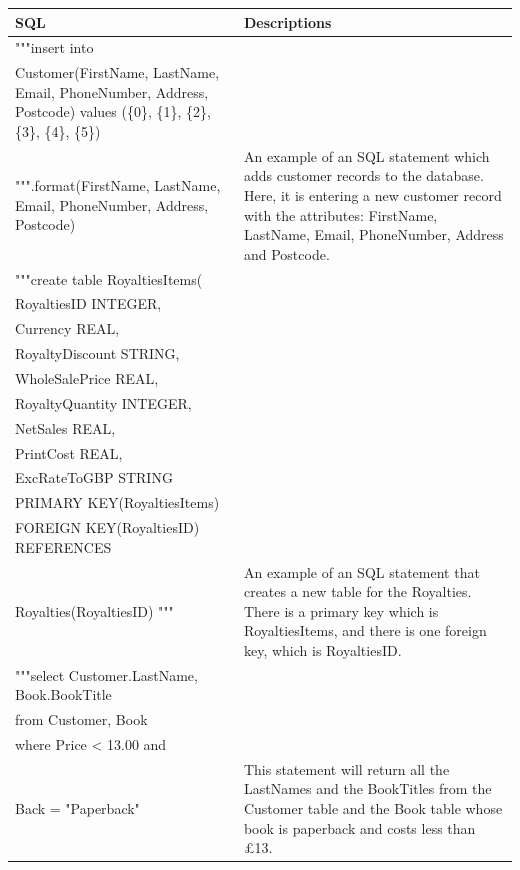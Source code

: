 \begin{tabular}{|p{10cm}|p{5cm}|}
    \hline
    \textbf{SQL} & \textbf{Descriptions} \\ \hline 
     """insert into \\ Customer(FirstName, LastName, Email, PhoneNumber, Address, Postcode) values (\{0\}, \{1\}, \{2\}, \{3\}, \{4\}, \{5\}) \\ """.format(FirstName, LastName, Email, PhoneNumber, Address, Postcode) & An example of an SQL statement which adds customer records to the database. Here, it is entering a new customer record with the attributes: FirstName, LastName, Email, PhoneNumber, Address and Postcode. \\ \hline
    """create table RoyaltiesItems(\\ RoyaltiesID INTEGER, \\ Currency REAL, \\ RoyaltyDiscount STRING,\\  WholeSalePrice REAL,\\ RoyaltyQuantity INTEGER,\\ NetSales REAL,\\ PrintCost REAL, \\ ExcRateToGBP STRING \\ PRIMARY KEY(RoyaltiesItems) \\ FOREIGN KEY(RoyaltiesID) REFERENCES \\ Royalties(RoyaltiesID) """ & An example of an SQL statement that creates a new table for the Royalties. There is a primary key which is RoyaltiesItems, and there is one foreign key, which is RoyaltiesID. \\ \hline 
    """select Customer.LastName, Book.BookTitle \\ from Customer, Book \\ where Price < 13.00 and \\ Back = "Paperback"  & This statement will return all the LastNames and the BookTitles from the Customer table and the Book table whose book is paperback and costs less than £13. \\ \hline
\end{tabular}

%
%
%
%

